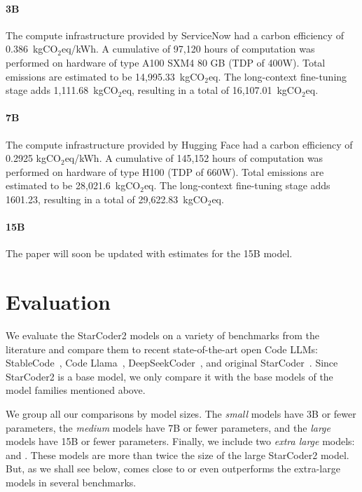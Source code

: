 \documentclass[10pt]{article} %
\begin{document}
\paragraph{3B}
The compute infrastructure provided by ServiceNow had a carbon efficiency of 0.386~kgCO$_2$eq/kWh. A cumulative of 97,120 hours of computation was performed on hardware of type A100 SXM4 80 GB (TDP of 400W). Total emissions are estimated to be 14,995.33~kgCO$_2$eq. The long-context fine-tuning stage adds 1,111.68~kgCO$_2$eq, resulting in a total of 16,107.01~kgCO$_2$eq.
    

\paragraph{7B}
The compute infrastructure provided by Hugging Face had a carbon efficiency of 0.2925 kgCO$_2$eq/kWh. A cumulative of 145,152 hours of computation was performed on hardware of type H100 (TDP of 660W). Total emissions are estimated to be 28,021.6~kgCO$_2$eq. The long-context fine-tuning stage adds 1601.23, resulting in a total of 29,622.83~kgCO$_2$eq.


\paragraph{15B} The paper will soon be updated with estimates for the 15B model. 

\section{Evaluation}





We evaluate the StarCoder2 models on a variety of benchmarks from the literature and compare them to recent state-of-the-art open Code LLMs: StableCode~\citep{stablecode3b}, Code Llama~\citep{roziere2023code}, DeepSeekCoder~\citep{guo2024deepseek}, and original StarCoder~\citep{li2023starcoder}.
Since StarCoder2 is a base model, we only compare it with the base models of the model families mentioned above.

We group all our comparisons by model sizes. The \emph{small} models have 3B or fewer parameters, the \emph{medium} models have 7B or fewer parameters, and the \emph{large} models have 15B or fewer parameters. Finally, we include two \emph{extra large} models:  and . These models are more than twice the size of the large StarCoder2 model. But, as we shall see below,  comes close to or even outperforms the extra-large models in several benchmarks.
\end{document}
